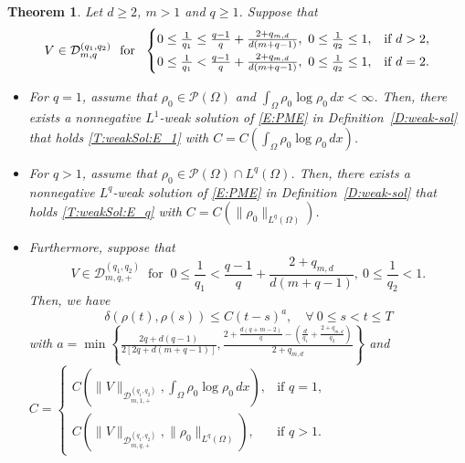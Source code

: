 \documentclass{amsart}
\newtheorem{theorem}[defn]{Theorem}
\numberwithin{equation}{section}
\begin{document}
\begin{theorem}\label{T:weakSol:divfree:PME}
Let $d\geq 2$, $m>1$ and $q\geq 1$.  
Suppose that 
\begin{equation}\label{T:weakSol:divfree:V:PME}
	V \in \mathcal{D}_{m,q}^{(q_1, q_2)} 
	\ \text{ for } \
	\begin{cases}
		0 \leq \frac{1}{q_1} \leq \frac{q-1}{q} + \frac{2+q_{m,d}}{d(m+q-1)}, \ 0 \leq \frac{1}{q_2} \leq 1, & \text{if } d > 2, \vspace{1 mm}\\
		0 \leq \frac{1}{q_1} < \frac{q-1}{q} + \frac{2+q_{m,d}}{d(m+q-1)}, \ 0 \leq \frac{1}{q_2} \leq 1, & \text{if } d = 2.
	\end{cases}
\end{equation}

\begin{itemize}
	\item[(i)] For $q=1$, assume that $\rho_0 \in \mathcal{P}(\Omega)$ and $\int_{\Omega} \rho_0 \log \rho_0 \,dx < \infty$. 
Then, there exists a nonnegative $L^1$-weak solution of \eqref{E:PME} in Definition~\ref{D:weak-sol} that holds \eqref{T:weakSol:E_1} with $C=C (\int_{\Omega} \rho_0 \log \rho_0 \,dx )$.

	\item[(ii)] For $q>1$, assume that $\rho_0 \in  \mathcal{P}(\Omega) \cap L^{q}(\Omega)$. Then, there exists a nonnegative $L^q$-weak solution of \eqref{E:PME} in Definition~\ref{D:weak-sol} that holds \eqref{T:weakSol:E_q} with $C=C (\|\rho_{0}\|_{L^{q} (\Omega)})$.
	
	\item[(iii)] Furthermore, suppose that 
	\begin{equation*}\label{T:weakSol:divfree:V:delta:PME}
	V \in \mathcal{D}_{m,q,+}^{(q_1, q_2)} 
	\ \text{ for } \
		0 \leq \frac{1}{q_1} < \frac{q-1}{q} + \frac{2+q_{m,d}}{d(m+q-1)}, \ 0 \leq \frac{1}{q_2} < 1.
	\end{equation*}
    Then, we have 
\begin{equation*}\label{T:weakSol:Narrow_2:PME}
\delta(\rho(t),\rho(s))\leq C(t-s)^{a},   \quad  \forall ~ 0\leq s<t\leq T 
\end{equation*}
with $a= \min \left\{ \frac{2q+d(q-1)}{2[2q+d(m+q-1)]}, \frac{2+\frac{d(q+m-2)}{q} - \left(\frac{d}{q_1} + \frac{2+q_{m,d}}{q_2}\right)}{2+q_{m,d}} \right\}$ 
and $C= \begin{cases}
	C ( \|V\|_{\mathcal{D}_{m,1,+}^{(q_1,q_2)}}, \int_{\Omega} \rho_0 \log \rho_0 \,dx ), & \text{if } q=1 , \\
	C (\|V\|_{\mathcal{D}_{m,q,+}^{(q_1,q_2)}}, \|\rho_{0}\|_{L^{q} (\Omega)} ), &\text{if } q>1.
\end{cases}$	
	
\end{itemize}

\end{theorem}
\end{document}
